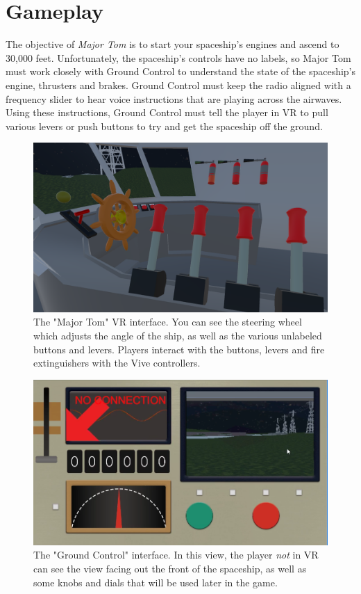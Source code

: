 \documentclass[sigconf]{acmart}
\begin{document}
\section{Gameplay}
The objective of \textit{Major Tom} is to start your spaceship's engines and ascend to 30,000 feet. Unfortunately, the spaceship's controls have no labels, so Major Tom must work closely with Ground Control to understand the state of the spaceship's engine, thrusters and brakes. Ground Control must keep the radio aligned with a frequency slider to hear voice instructions that are playing across the airwaves. Using these instructions, Ground Control must tell the player in VR to pull various levers or push buttons to try and get the spaceship off the ground.


\begin{figure}[p]
	\includegraphics[width=6.5in]{MAJOR_TOM_VR}
	\caption{The "Major Tom" VR interface. You can see the steering wheel which adjusts the angle of the ship, as well as the various unlabeled buttons and levers. Players interact with the buttons, levers and fire extinguishers with the Vive controllers.}
	\label{fig:majortom}
\end{figure}

\begin{figure}[p]
	\includegraphics[width=6.5in]{MAJOR_TOM_GroundControl1}
	\caption{The "Ground Control" interface. In this view, the player \textit{not} in VR can see the view facing out the front of the spaceship, as well as some knobs and dials that will be used later in the game.}
	\label{fig:groundcontrol}
\end{figure}
\end{document}
